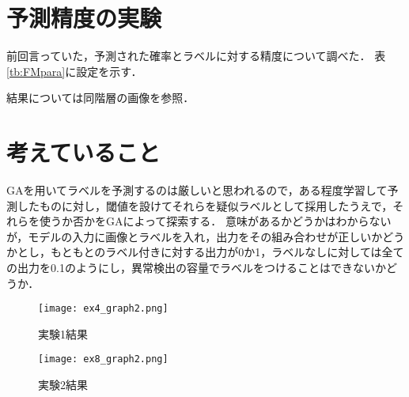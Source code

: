 \documentclass[twocolumn]{jarticle}     %
\begin{document}
\section{予測精度の実験}
前回言っていた，予測された確率とラベルに対する精度について調べた．
表\ref{tb:FMpara}に設定を示す．\\
\begin{table}[h]
	\centering
	\caption{FixMatchの設定\label{tb:FMpara}}
\end{table}
結果については同階層の画像を参照．

\section{考えていること}
GAを用いてラベルを予測するのは厳しいと思われるので，ある程度学習して予測したものに対し，閾値を設けてそれらを疑似ラベルとして採用したうえで，それらを使うか否かをGAによって探索する．
意味があるかどうかはわからないが，モデルの入力に画像とラベルを入れ，出力をその組み合わせが正しいかどうかとし，もともとのラベル付きに対する出力が0か1，ラベルなしに対しては全ての出力を0.1のようにし，異常検出の容量でラベルをつけることはできないかどうか．

\begin{figure}[tp]
	\begin{center}
		\centering
		\texttt{[image: ex4\_graph2.png]}
		\caption{実験1結果\label{fig:ex1}}
	\end{center}
\end{figure}

\begin{figure}[tp]
	\begin{center}
		\centering
		\texttt{[image: ex8\_graph2.png]}
		\caption{実験2結果\label{fig:ex2}}
	\end{center}
\end{figure}
\end{document}
